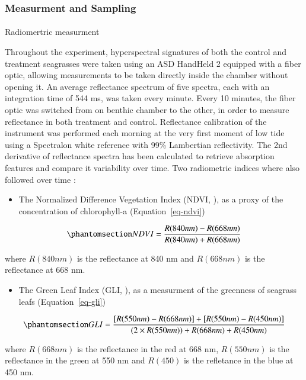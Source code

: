 \documentclass[
  number]{elsarticle}
\makeatletter
\let\oldparagraph\paragraph
\renewcommand{\paragraph}{
    \@ifstar
      \xxxParagraphStar
      \xxxParagraphNoStar
  }
\newcommand{\xxxParagraphStar}[1]{\oldparagraph*{#1}\mbox{}}
\newcommand{\xxxParagraphNoStar}[1]{\oldparagraph{#1}\mbox{}}
\providecommand{\tightlist}{%
  \setlength{\itemsep}{0pt}\setlength{\parskip}{0pt}}\usepackage{longtable,booktabs,array}
\makeatother
\begin{document}
\subsubsection{Measurment and Sampling}\label{measurment-and-sampling}

\paragraph{Radiomertric measurment}\label{radiomertric-measurment}

Throughout the experiment, hyperspectral signatures of both the control
and treatment seagrasses were taken using an ASD HandHeld 2 equipped
with a fiber optic, allowing measurements to be taken directly inside
the chamber without opening it. An average reflectance spectrum of five
spectra, each with an integration time of 544 ms, was taken every
minute. Every 10 minutes, the fiber optic was switched from on benthic
chamber to the other, in order to measure reflectance in both treatment
and control. Reflectance calibration of the instrument was performed
each morning at the very first moment of low tide using a Spectralon
white reference with 99\% Lambertian reflectivity. The 2nd derivative of
reflectance spectra has been calculated to retrieve absorption features
and compare it variability over time. Two radiometric indices where also
followed over time :

\begin{itemize}
\tightlist
\item
  The Normalized Difference Vegetation Index (NDVI,
  \citep{rouse1974monitoring}), as a proxy of the concentration of
  chlorophyll-a (Equation~\ref{eq-ndvi})
\end{itemize}

\begin{equation}\phantomsection\label{eq-ndvi}{
NDVI = \frac{R(840nm)-R(668nm)}{R(840nm)+R(668nm)}
}\end{equation}

where \(R(840nm)\) is the reflectance at 840 nm and \(R(668nm)\) is the
reflectance at 668 nm.

\begin{itemize}
\tightlist
\item
  The Green Leaf Index (GLI, \citep{louhaichi2001spatially}), as a
  measurment of the greenness of seagrass leafs (Equation~\ref{eq-gli})
\end{itemize}

\begin{equation}\phantomsection\label{eq-gli}{
GLI = \frac{[R(550nm)-R(668nm)]+[R(550nm)-R(450nm)]}{(2 \times R(550nm) )+ R(668nm) + R(450nm) }
}\end{equation}

where \(R(668nm)\) is the reflectance in the red at 668 nm, \(R(550nm)\)
is the reflectance in the green at 550 nm and \(R(450)\) is the
refletance in the blue at 450 nm.


\renewcommand\refname{Bibliography}
  
\end{document}
